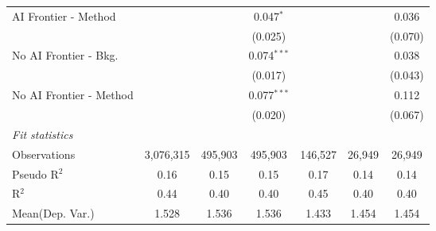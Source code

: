 \begin{tabular}{lcccccc}
   AI Frontier - Method    &               &               & 0.047$^{*}$   &               &               & 0.036\\   
                           &               &               & (0.025)       &               &               & (0.070)\\   
   No AI Frontier - Bkg.   &               &               & 0.074$^{***}$ &               &               & 0.038\\   
                           &               &               & (0.017)       &               &               & (0.043)\\   
   No AI Frontier - Method &               &               & 0.077$^{***}$ &               &               & 0.112\\   
                           &               &               & (0.020)       &               &               & (0.067)\\   
   \midrule
   \emph{Fit statistics}\\
   Observations            & 3,076,315     & 495,903       & 495,903       & 146,527       & 26,949        & 26,949\\  
   Pseudo R$^2$            & 0.16          & 0.15          & 0.15          & 0.17          & 0.14          & 0.14\\  
   R$^2$                   & 0.44          & 0.40          & 0.40          & 0.45          & 0.40          & 0.40\\  
Mean(Dep. Var.) & 1.528 & 1.536 & 1.536 & 1.433 & 1.454 & 1.454 \\
   

\end{tabular}
